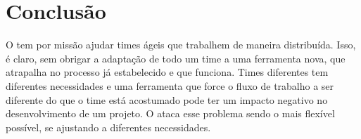 \section{Conclusão}

O \calopsita{} tem por missão ajudar times ágeis que trabalhem de maneira distribuída. Isso, é claro, sem obrigar
a adaptação de todo um time a uma ferramenta nova, que atrapalha no processo já estabelecido e que funciona. Times
diferentes tem diferentes necessidades e uma ferramenta que force o fluxo de trabalho a ser diferente do que o time 
está acostumado pode ter um impacto negativo no desenvolvimento de um projeto. O \calopsita{} ataca esse problema
sendo o mais flexível possível, se ajustando a diferentes necessidades.

